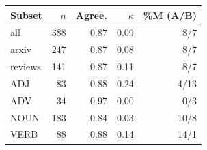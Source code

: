 \begin{tabular}{lrrrr}
\toprule
Subset & $n$ & Agree. & $\kappa$ & \%M (A/B) \\
\midrule
all & 388 & 0.87 & 0.09 & 8/7 \\
arxiv & 247 & 0.87 & 0.08 & 8/7 \\
reviews & 141 & 0.87 & 0.11 & 8/7 \\
ADJ & 83 & 0.88 & 0.24 & 4/13 \\
ADV & 34 & 0.97 & 0.00 & 0/3 \\
NOUN & 183 & 0.84 & 0.03 & 10/8 \\
VERB & 88 & 0.88 & 0.14 & 14/1 \\
\bottomrule
\end{tabular}
